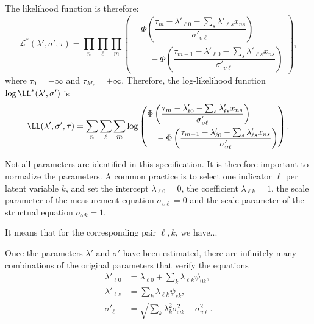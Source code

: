 \documentclass[12pt,a4paper]{article}
\begin{document}
The likelihood function is therefore:
\[
\mathcal{L}^*(\lambda', \sigma', \tau) = 
\prod_n \prod_\ell \prod_m 
\left(
\begin{aligned}
&\Phi\left(
\dfrac{
\tau_m - \lambda'_{\ell 0} - \sum_s \lambda'_{\ell s} x_{ns}
}{
\sigma'_{\upsilon \ell}
}
\right) \\
&\quad - \Phi\left(
\dfrac{
\tau_{m-1} - \lambda'_{\ell 0} - \sum_s \lambda'_{\ell s} x_{ns}
}{
\sigma'_{\upsilon \ell}
}
\right)
\end{aligned}
\right),
\]
where $\tau_0=-\infty$ and $\tau_{M_\ell}=+\infty$. Therefore, the log-likelihood function $\log \LL^*(\lambda', \sigma')$ is 
\[
\LL(\lambda', \sigma', \tau) = 
\sum_n \sum_\ell \sum_m \log 
\left(
\begin{aligned}
&\Phi\left(
\dfrac{
\tau_m - \lambda'_{\ell 0} - \sum_s \lambda'_{\ell s} x_{ns}
}{
\sigma'_{\upsilon \ell}
}
\right) \\
&\quad - \Phi\left(
\dfrac{
\tau_{m-1} - \lambda'_{\ell 0} - \sum_s \lambda'_{\ell s} x_{ns}
}{
\sigma'_{\upsilon \ell}
}
\right)
\end{aligned}
\right).
\]

Not all parameters are identified in this specification. It is
therefore important to normalize the parameters.  A common practice is
to select one indicator $\ell$ per latent variable $k$, and set the
intercept $\lambda_{\ell 0} =0$, the coefficient $\lambda_{\ell k} =1$,
the scale parameter of the measurement equation $\sigma_{\upsilon \ell}=0$ and the scale parameter of the structual equation $\sigma_{\omega k}=1$.

It means that for the corresponding pair $\ell, k$, we have...


Once the parameters $\lambda'$ and $\sigma'$ have been estimated, there are infinitely many combinations of the original parameters that verify the equations
\begin{align*}
  \lambda'_{\ell 0} &=\lambda_{\ell 0}+\sum_k \lambda_{\ell k} \psi_{0k}, \\
  \lambda'_{\ell s} &=\sum_{k} \lambda_{\ell k} \psi_{sk}, \\
  \sigma'_{\ell}&=\sqrt{\sum_k \lambda^2_k \sigma_{\omega k}^2+\sigma^2_{\upsilon \ell}}.
\end{align*}
\end{document}

